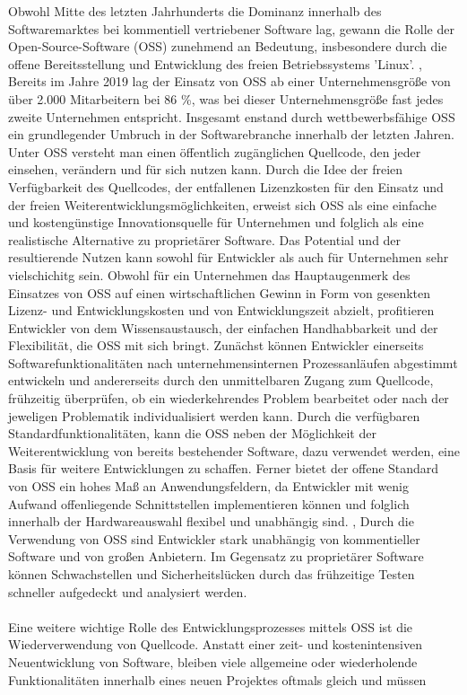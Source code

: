 Obwohl Mitte des letzten Jahrhunderts die Dominanz innerhalb des Softwaremarktes bei kommentiell vertriebener Software lag, gewann die Rolle der Open-Source-Software (OSS) zunehmend an Bedeutung, insbesondere durch die offene Bereitsstellung und Entwicklung des freien Betriebssystems 'Linux'. \cite[S. 8 - 11]{wichmann_linux-_2005}, \cite[S. 1]{will_open-source-software_2003} Bereits im Jahre 2019 lag der Einsatz von OSS ab einer Unternehmensgröße von über 2.000 Mitarbeitern bei 86 \%, was bei dieser Unternehmensgröße fast jedes zweite Unternehmen entspricht. \cite[S. 15]{bitkom_ev_open_2016} Insgesamt enstand durch wettbewerbsfähige OSS ein grundlegender Umbruch in der Softwarebranche innerhalb der letzten Jahren. \cite[S. 185]{bitzer_entwicklung_2007} \cite{fitzgerald_transformation_2006} Unter OSS versteht man einen öffentlich zugänglichen Quellcode, den jeder einsehen, verändern und für sich nutzen kann. Durch die Idee der freien Verfügbarkeit des Quellcodes, der entfallenen Lizenzkosten für den Einsatz und der freien Weiterentwicklungsmöglichkeiten, erweist sich OSS als eine einfache und kostengünstige Innovationsquelle für Unternehmen und folglich als eine realistische Alternative zu proprietärer Software. \cite[S. 21,22]{allmann_open_2019} Das Potential und der resultierende Nutzen kann sowohl für Entwickler als auch für Unternehmen sehr vielschichitg sein. Obwohl für ein Unternehmen das Hauptaugenmerk des Einsatzes von OSS auf einen wirtschaftlichen Gewinn in Form von gesenkten Lizenz- und Entwicklungskosten und von Entwicklungszeit abzielt, profitieren Entwickler von dem Wissensaustausch, der einfachen Handhabbarkeit und der Flexibilität, die OSS mit sich bringt. \cite{lerner_economic_2005} Zunächst können Entwickler einerseits Softwarefunktionalitäten nach unternehmensinternen Prozessanläufen abgestimmt entwickeln und andererseits durch den unmittelbaren Zugang zum Quellcode, frühzeitig überprüfen, ob ein wiederkehrendes Problem bearbeitet oder nach der jeweligen Problematik individualisiert werden kann. Durch die verfügbaren Standardfunktionalitäten, kann die OSS neben der Möglichkeit der Weiterentwicklung von bereits bestehender Software, dazu verwendet werden, eine Basis für weitere Entwicklungen zu schaffen. \cite[S. 37/38]{kesler_anpassung_2013} Ferner bietet der offene Standard von OSS ein hohes Maß an Anwendungsfeldern, da Entwickler mit wenig Aufwand offenliegende Schnittstellen implementieren können und folglich innerhalb der Hardwareauswahl flexibel und unabhängig sind. \cite[S. 2]{kesler_anpassung_2013}, \cite[S. 21,22]{allmann_open_2019} Durch die Verwendung von OSS sind Entwickler stark unabhängig von kommentieller Software und von großen Anbietern. Im Gegensatz zu proprietärer Software können Schwachstellen und Sicherheitslücken durch das frühzeitige Testen schneller aufgedeckt und analysiert werden. \cite[S. 30/31]{kees_open_2015}\\\\ Eine weitere wichtige Rolle des Entwicklungsprozesses mittels OSS ist die Wiederverwendung von Quellcode. Anstatt einer zeit- und kostenintensiven Neuentwicklung von Software, bleiben viele allgemeine oder wiederholende Funktionalitäten innerhalb eines neuen Projektes oftmals gleich und müssen 